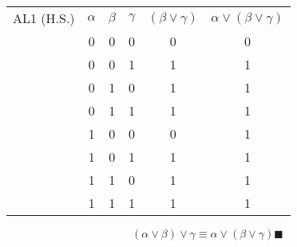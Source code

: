 \documentclass[a4paper, 12pt]{article}  %
\begin{document}
\begin{table}[H]
    \begin{tabular}{c|c|c|c|c|c|}
        AL1 (H.S.) & $\alpha$ & $\beta$ & $\gamma$ & $(\beta \lor \gamma)$ & $\alpha \lor (\beta \lor \gamma) $ \\
                   & 0        & 0       & 0        & 0                     & 0                                  \\
                   & 0        & 0       & 1        & 1                     & 1                                  \\
                   & 0        & 1       & 0        & 1                     & 1                                  \\
                   & 0        & 1       & 1        & 1                     & 1                                  \\
                   & 1        & 0       & 0        & 0                     & 1                                  \\
                   & 1        & 0       & 1        & 1                     & 1                                  \\
                   & 1        & 1       & 0        & 1                     & 1                                  \\
                   & 1        & 1       & 1        & 1                     & 1                                  \\
    \end{tabular}
    \begin{equation*}
        (\alpha \lor \beta) \lor \gamma \equiv \alpha \lor (\beta \lor \gamma) \blacksquare
    \end{equation*}
\end{table}
\end{document}
